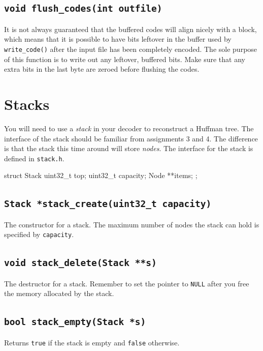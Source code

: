 \documentclass[11pt]{article}
\begin{document}
\subsection{\texttt{void flush\_codes(int outfile)}}

It is not always guaranteed that the buffered codes will align nicely
with a block, which means that it is possible to have bits leftover in
the buffer used by \texttt{write\_code()} after the input file has been
completely encoded. The sole purpose of this function is to write out
any leftover, buffered bits. Make sure that any extra bits in the last
byte are zeroed before flushing the codes.

\section{Stacks}

You will need to use a \emph{stack} in your decoder to reconstruct a
Huffman tree. The interface of the stack should be familiar from
assignments 3 and 4. The difference is that the stack this time around
will store \emph{nodes}. The interface for the stack is defined in
\texttt{stack.h}.

\begin{codelisting}{}
struct Stack {
    uint32_t top;
    uint32_t capacity;
    Node **items;
};
\end{codelisting}


\subsection{\texttt{Stack *stack\_create(uint32\_t capacity)}}

The constructor for a stack. The maximum number of nodes the stack can
hold is specified by \texttt{capacity}.

\subsection{\texttt{void stack\_delete(Stack **s)}}

The destructor for a stack. Remember to set the pointer to \texttt{NULL}
after you free the memory allocated by the stack.

\subsection{\texttt{bool stack\_empty(Stack *s)}}

Returns \texttt{true} if the stack is empty and \texttt{false}
otherwise.
\end{document}
